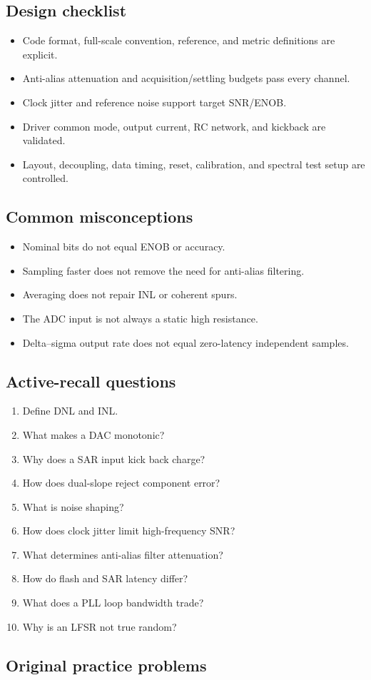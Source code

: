 \documentclass[10pt,letterpaper]{article}
\begin{document}
\subsection{Design checklist}
\begin{itemize}
  \item Code format, full-scale convention, reference, and metric definitions are explicit.
  \item Anti-alias attenuation and acquisition/settling budgets pass every channel.
  \item Clock jitter and reference noise support target SNR/ENOB.
  \item Driver common mode, output current, RC network, and kickback are validated.
  \item Layout, decoupling, data timing, reset, calibration, and spectral test setup are controlled.
\end{itemize}\subsection{Common misconceptions}
\begin{itemize}
  \item Nominal bits do not equal ENOB or accuracy.
  \item Sampling faster does not remove the need for anti-alias filtering.
  \item Averaging does not repair INL or coherent spurs.
  \item The ADC input is not always a static high resistance.
  \item Delta--sigma output rate does not equal zero-latency independent samples.
\end{itemize}\subsection{Active-recall questions}
\begin{enumerate}
  \item Define DNL and INL.
  \item What makes a DAC monotonic?
  \item Why does a SAR input kick back charge?
  \item How does dual-slope reject component error?
  \item What is noise shaping?
  \item How does clock jitter limit high-frequency SNR?
  \item What determines anti-alias filter attenuation?
  \item How do flash and SAR latency differ?
  \item What does a PLL loop bandwidth trade?
  \item Why is an LFSR not true random?
\end{enumerate}\subsection{Original practice problems}
\end{document}
